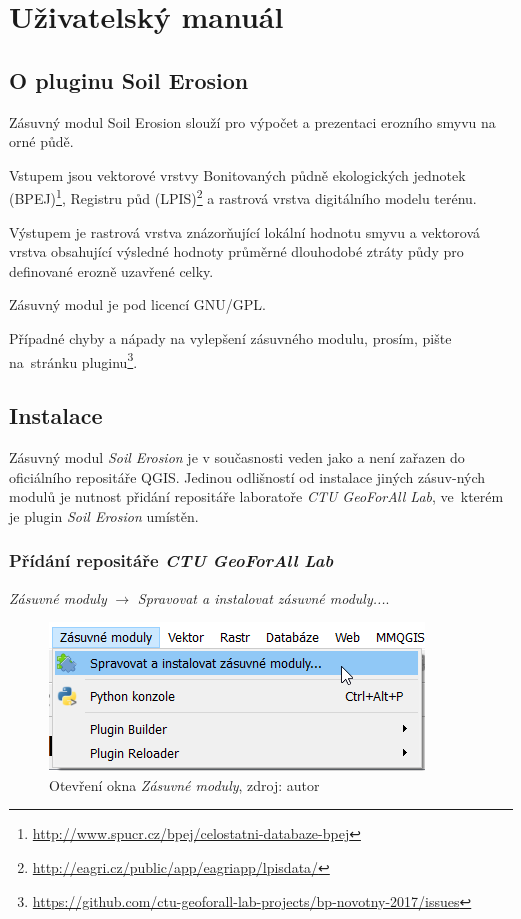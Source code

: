 \chapter{Uživatelský manuál}
\label{6-manual}
\section{O pluginu Soil Erosion}
\label{o_pluginu} Zásuvný modul Soil Erosion slouží pro výpočet a
prezentaci erozního smyvu na orné půdě.

Vstupem jsou vektorové vrstvy Bonitovaných půdně ekologických jednotek
(BPEJ)\footnote{\url{http://www.spucr.cz/bpej/celostatni-databaze-bpej}},
Registru půd
(LPIS)\footnote{\url{http://eagri.cz/public/app/eagriapp/lpisdata/}} a
rastrová vrstva digitálního modelu terénu.

Výstupem je rastrová vrstva znázorňující lokální hodnotu smyvu a
vektorová vrstva obsahující výsledné hodnoty průměrné dlouhodobé
ztráty půdy pro definované erozně uzavřené celky.

Zásuvný modul je pod licencí GNU/GPL.

Případné chyby a nápady na vylepšení zásuvného modulu, prosím, pište na~stránku
pluginu\footnote{\url{https://github.com/ctu-geoforall-lab-projects/bp-novotny-2017/issues}}.

\section{Instalace}
\label{manual_instalace} Zásuvný modul \textit{Soil Erosion} je v
současnosti veden jako  a není zařazen do
oficiálního repositáře QGIS. Jedinou odlišností od instalace jiných
zásuv-ných modulů je nutnost přidání repositáře laboratoře
\textit{CTU GeoForAll Lab}, ve~kterém je plugin \textit{Soil Erosion}
umístěn.


\subsection{Přídání repositáře \textit{CTU GeoForAll Lab}} \textit{Zásuvné
moduly} $\rightarrow$ \textit{Spravovat a instalovat zásuvné
moduly...}.

	\begin{figure}[H] \centering
		\includegraphics[width=.6\textwidth]{./pictures/otevreni_okna_zasuvne_moduly.png}
		\caption[Otevření okna \textit{Zásuvné
moduly}]{Otevření okna \textit{Zásuvné moduly}, zdroj: autor}
		\label{fig:manual_otevreni_okna_zasuvne_moduly}
 	\end{figure}
 	
